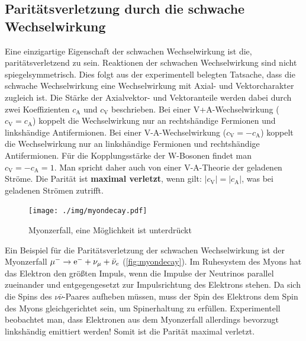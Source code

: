 \subsection{Paritätsverletzung durch die schwache Wechselwirkung}
Eine einzigartige Eigenschaft der schwachen Wechselwirkung ist die, paritätsverletzend zu sein.
Reaktionen der schwachen Wechselwirkung sind nicht spiegelsymmetrisch.
Dies folgt aus der experimentell belegten Tatsache, dass die schwache Wechselwirkung eine Wechselwirkung mit Axial- und Vektorcharakter zugleich ist.
Die Stärke der Axialvektor- und Vektoranteile werden dabei durch zwei Koeffizienten $c_\text{A}$ und $c_\text{V}$ beschrieben.
Bei einer V+A-Wechselwirkung ($c_\text{V}=c_\text{A}$) koppelt die Wechselwirkung nur an rechtshändige Fermionen und linkshändige Antifermionen.
Bei einer V-A-Wechselwirkung ($c_\text{V}=-c_\text{A}$) koppelt die Wechselwirkung nur an linkshändige Fermionen und rechtshändige Antifermionen.
Für die Kopplungsstärke der W-Bosonen findet man $c_\text{V}=-c_\text{A}=1$.
Man spricht daher auch von einer V-A-Theorie der geladenen Ströme.
Die Parität ist \textbf{maximal verletzt}, wenn gilt: $|c_\text{V}|=|c_\text{A}|$, was bei geladenen Strömen zutrifft.

\begin{figure}
	\centering
	\texttt{[image: ./img/myondecay.pdf]}
	\caption{Myonzerfall, eine Möglichkeit ist unterdrückt}
	\label{fig:myondecay}
\end{figure}
Ein Beispiel für die Paritätsverletzung der schwachen Wechselwirkung ist der Myonzerfall $\mu^-\rightarrow\text{e}^- + \nu_\mu + \bar{\nu}_e$ (\autoref{fig:myondecay}).
Im Ruhesystem des Myons hat das Elektron den größten Impuls, wenn die Impulse der Neutrinos parallel zueinander und entgegengesetzt zur Impulsrichtung des Elektrons stehen.
Da sich die Spins des $\nu\bar{\nu}$-Paares aufheben müssen, muss der Spin des Elektrons dem Spin des Myons gleichgerichtet sein, um Spinerhaltung zu erfüllen.
Experimentell beobachtet man, dass Elektronen aus dem Myonzerfall allerdings bevorzugt linkshändig emittiert werden!
Somit ist die Parität maximal verletzt.

